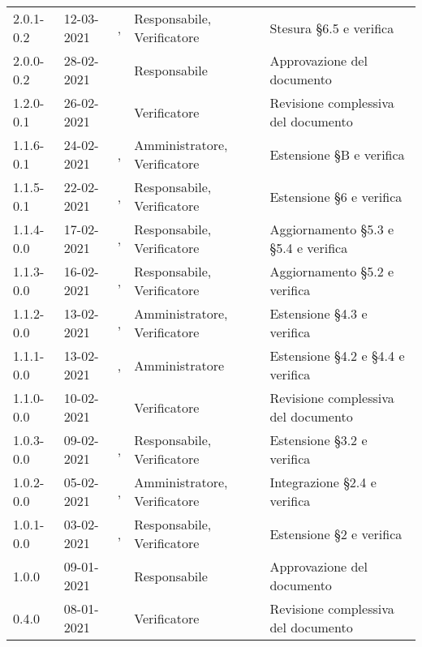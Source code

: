 {{\begin{longtable}{C{1.7cm} | C{2.2cm} | C{3.2cm} | C{3cm} | C{4.8cm}}
2.0.1-0.2 & 12-03-2021 & \ZM{}, \SG{} & Responsabile, Verificatore & Stesura \S 6.5 e verifica\\

2.0.0-0.2 & 28-02-2021 & \ZM{} & Responsabile & Approvazione del documento\\

1.2.0-0.1 & 26-02-2021 & \SP{} & Verificatore & Revisione complessiva del documento\\

1.1.6-0.1 & 24-02-2021 & \SG{}, \SP{} & Amministratore, Verificatore & Estensione \S B e verifica\\

1.1.5-0.1 & 22-02-2021 & \ZM{}, \SP{} & Responsabile, Verificatore & Estensione \S 6 e verifica\\

1.1.4-0.0 & 17-02-2021 & \PA{}, \ZM{} & Responsabile, Verificatore & Aggiornamento \S 5.3 e \S 5.4 e verifica\\

1.1.3-0.0 & 16-02-2021 & \PA{}, \ZM{} & Responsabile, Verificatore & Aggiornamento \S 5.2 e verifica\\

1.1.2-0.0 & 13-02-2021 & \BM{}, \ZM{} & Amministratore, Verificatore & Estensione \S 4.3 e verifica\\

1.1.1-0.0 & 13-02-2021 & \SG{}, \ZM{} & Amministratore & Estensione \S 4.2 e \S 4.4 e verifica\\

1.1.0-0.0 & 10-02-2021 & \ZM{} & Verificatore & Revisione complessiva del documento\\

1.0.3-0.0 & 09-02-2021 & \PA{}, \SP{} & Responsabile, Verificatore & Estensione \S 3.2 e verifica\\

1.0.2-0.0 & 05-02-2021& \BM{}, \SP{} & Amministratore, Verificatore & Integrazione \S 2.4 e verifica\\

1.0.1-0.0 & 03-02-2021 & \PA{}, \SP{} & Responsabile, Verificatore & Estensione \S 2 e verifica\\

1.0.0 & 09-01-2021 & \SG{} & Responsabile & Approvazione del documento \\

0.4.0 & 08-01-2021 & \ZM{} & Verificatore & Revisione complessiva del documento \\


\end{longtable}}}
